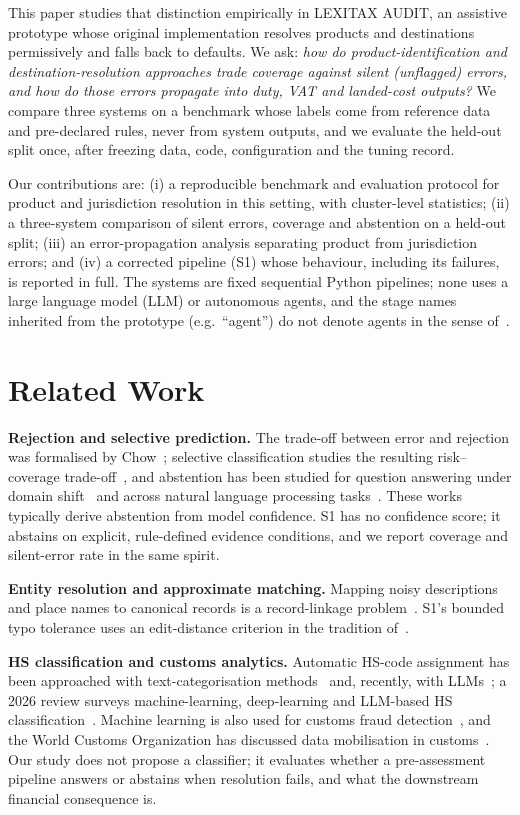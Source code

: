 \documentclass[conference]{IEEEtran}
\begin{document}
This paper studies that distinction empirically in LEXITAX AUDIT, an assistive prototype whose original implementation
resolves products and destinations permissively and falls back to defaults. We ask: \emph{how do product-identification
and destination-resolution approaches trade coverage against silent (unflagged) errors, and how do those errors
propagate into duty, VAT and landed-cost outputs?} We compare three systems on a benchmark whose labels come from
reference data and pre-declared rules, never from system outputs, and we evaluate the held-out split once, after freezing
data, code, configuration and the tuning record.

Our contributions are: (i) a reproducible benchmark and evaluation protocol for product and jurisdiction resolution in
this setting, with cluster-level statistics; (ii) a three-system comparison of silent errors, coverage and abstention on
a held-out split; (iii) an error-propagation analysis separating product from jurisdiction errors; and (iv) a corrected
pipeline (S1) whose behaviour, including its failures, is reported in full. The systems are fixed sequential Python
pipelines; none uses a large language model (LLM) or autonomous agents, and the stage names inherited from the prototype
(e.g.\ ``agent'') do not denote agents in the sense of~\cite{wooldridge1995}.

\section{Related Work}
\textbf{Rejection and selective prediction.} The trade-off between error and rejection was formalised by
Chow~\cite{chow1970}; selective classification studies the resulting risk--coverage trade-off~\cite{elyaniv2010,
geifman2017}, and abstention has been studied for question answering under domain shift~\cite{kamath2020} and across
natural language processing tasks~\cite{xin2021}. These works typically derive abstention from model confidence. S1 has
no confidence score; it abstains on explicit, rule-defined evidence conditions, and we report coverage and silent-error
rate in the same spirit.

\textbf{Entity resolution and approximate matching.} Mapping noisy descriptions and place names to canonical records is
a record-linkage problem~\cite{fellegi1969, elmagarmid2007, christen2012}. S1's bounded typo tolerance uses an
edit-distance criterion in the tradition of~\cite{damerau1964, navarro2001}.

\textbf{HS classification and customs analytics.} Automatic HS-code assignment has been approached with
text-categorisation methods~\cite{ding2015} and, recently, with LLMs~\cite{koch2025}; a 2026 review surveys machine-learning,
deep-learning and LLM-based HS classification~\cite{wube2026}. Machine learning is also used for customs fraud
detection~\cite{kim2020date}, and the World Customs Organization has discussed data mobilisation in
customs~\cite{mikuriya2020}. Our study does not propose a classifier; it evaluates whether a pre-assessment pipeline
answers or abstains when resolution fails, and what the downstream financial consequence is.
\end{document}
